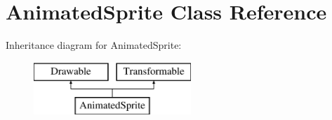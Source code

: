 \hypertarget{class_animated_sprite}{}\section{Animated\+Sprite Class Reference}
\label{class_animated_sprite}
Inheritance diagram for Animated\+Sprite\+:\begin{figure}[H]
\begin{center}
\leavevmode
\includegraphics[height=2.000000cm]{class_animated_sprite}
\end{center}
\end{figure}
